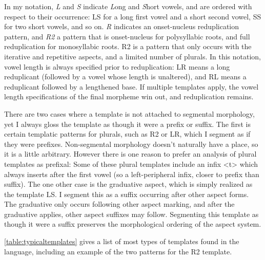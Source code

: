 In my notation, \textit{L} and \textit{S} indicate \textit{L}ong and \textit{S}hort vowels, and are ordered with respect to their occurrence: LS for a long first vowel and a short second vowel, SS for two short vowels, and so on. \textit{R} indicates an onset-nucleus reduplication pattern, and \textit{R2} a pattern that is onset-nucleus for polysyllabic roots, and full reduplication for monosyllabic roots. R2 is a pattern that only occurs with the iterative and repetitive aspects, and a limited number of plurals. In this notation, vowel length is always specified prior to reduplication: LR means a long reduplicant (followed by a vowel whose length is unaltered), and RL means a reduplicant followed by a lengthened base. If multiple templates apply, the vowel length specifications of the final morpheme win out, and reduplication remains.

There are two cases where a template is not attached to segmental morphology, yet I always gloss the template as though it were a prefix or suffix. The first is certain templatic patterns for plurals, such as R2 or LR, which I segment as if they were prefixes. Non-segmental morphology doesn't naturally have a place, so it is a little arbitrary. However there is one reason to prefer an analysis of plural templates as prefixal: Some of these plural templates include an infix <t> which always inserts after the first vowel (so a left-peripheral infix, closer to prefix than suffix). The one other case is the graduative aspect, which is simply realized as the template LS. I segment this as a suffix occurring after other aspect forms. The graduative only occurs following other aspect marking, and after the graduative applies, other aspect suffixes may follow. Segmenting this template as though it were a suffix preserves the morphological ordering of the aspect system.

\cref{table:typicaltemplates} gives a list of most types of templates found in the language, including an example of the two patterns for the R2 template.

